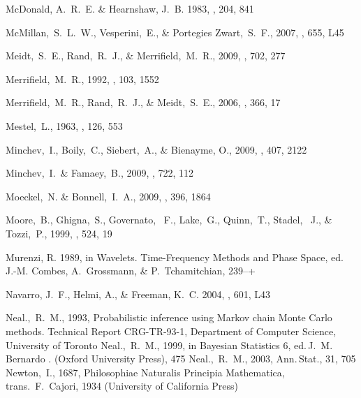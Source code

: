 \begin{thebibliography}{99}
{McDonald}, A.~R.~E. \& {Hearnshaw}, J.~B. 1983, \mnras, 204, 841

  McMillan,~S.~L.~W., Vesperini,~E., \& Portegies Zwart,~S.~F., 2007,
  \apjl, 655, L45

  Meidt,~S.~E., Rand,~R.~J., \& Merrifield,~M.~R., 2009,
  \apj, 702, 277

  Merrifield,~M.~R., 1992, \aj, 103, 1552

  Merrifield,~M.~R., Rand,~R.~J., \& Meidt,~S.~E., 2006,
  \mnras, 366, 17

  Mestel,~L., 1963,
  \mnras, 126, 553

  Minchev,~I., Boily,~C., Siebert,~A., \& Bienayme, O., 2009,
  \mnras, 407, 2122

  Minchev,~I.~\& Famaey,~B., 2009,
  \apj, 722, 112

  Moeckel,~N. \& Bonnell,~I.~A., 2009,
  \mnras, 396, 1864

  Moore,~B., Ghigna,~S., Governato, ~F., Lake,~G., Quinn,~T., Stadel, ~J.,  \& Tozzi,~P., 1999, \apj, 524, 19

{Murenzi}, R. 1989, in Wavelets. Time-Frequency Methods and Phase Space, ed.
  J.-M. {Combes}, A.~{Grossmann}, \& P.~{Tchamitchian}, 239--+

{Navarro}, J.~F., {Helmi}, A., \& {Freeman}, K.~C. 2004, \apjl, 601, L43

  Neal.,~R.~M., 1993,
  Probabilistic inference using {M}arkov chain {M}onte {C}arlo methods.
  Technical Report CRG-TR-93-1, Department of Computer Science,
  University of Toronto
  Neal.,~R.~M., 1999,
  in Bayesian Statistics 6,
  ed.\,J.~M. Bernardo \etal. (Oxford University Press), 475
  Neal.,~R.~M., 2003,
  Ann.\,Stat., 31, 705
  Newton,~I., 1687,
  Philosophiae Naturalis Principia Mathematica,
  trans.\ F.~Cajori, 1934
  (University of California Press)


\end{thebibliography}
